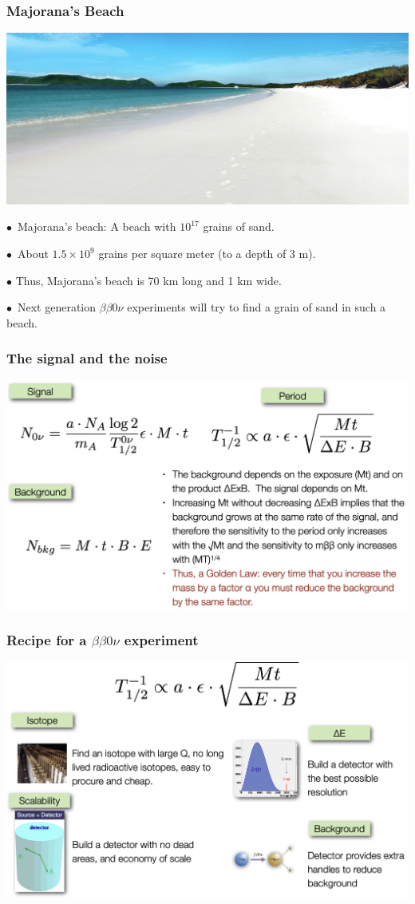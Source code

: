 \begin{frame}
\frametitle{Majorana's Beach}
\includegraphics[scale=0.30]{img/beach}

$\bullet$~Majorana’s beach: A beach with $10^{17}$ grains of sand.

$\bullet$~About $1.5 \times 10^9$ grains per square meter (to a depth of 3 m).

$\bullet$ Thus, Majorana’s beach is 70 km long and 1 km wide.

$\bullet$~Next generation $\beta\beta 0 \nu$ experiments will try to find a grain of sand in such a beach. 
\end{frame}

\begin{frame}
\frametitle{The signal and the noise}
\includegraphics[scale=0.30]{img/signalAndNoise.png}
\end{frame}


\begin{frame}
\frametitle{Recipe for a $\beta \beta 0 \nu$ experiment}
\includegraphics[scale=0.30]{img/RecipeExperiment.png}
\end{frame}


%
%
%
%
%
